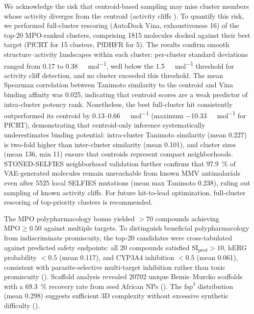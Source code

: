 \documentclass[journal=jcisd8,manuscript=article]{achemso}
\begin{document}
We acknowledge the risk that centroid-based sampling may miss cluster members whose activity diverges from the centroid (activity cliffs \cite{Maggiora2006}). To quantify this risk, we performed full-cluster rescoring (AutoDock Vina, exhaustiveness \num{16}) of the top-20 MPO-ranked clusters, comprising \num{1815} molecules docked against their best target (PfCRT for 15 clusters, PfDHFR for 5). The results confirm smooth structure--activity landscapes within each cluster: per-cluster standard deviations ranged from \num{0.17} to \num{0.38}~\si{\kilo\calorie\per\mole}, well below the \qty{1.5}{\kilo\calorie\per\mole} threshold for activity cliff detection, and no cluster exceeded this threshold. The mean Spearman correlation between Tanimoto similarity to the centroid and Vina binding affinity was \num{0.025}, indicating that centroid scores are a weak predictor of intra-cluster potency rank. Nonetheless, the best full-cluster hit consistently outperformed its centroid by \numrange{0.13}{0.66}~\si{\kilo\calorie\per\mole} (maximum \qty{-10.33}{\kilo\calorie\per\mole} for PfCRT), demonstrating that centroid-only inference systematically underestimates binding potential: intra-cluster Tanimoto similarity (mean \num{0.227}) is two-fold higher than inter-cluster similarity (mean \num{0.101}), and cluster sizes (mean \num{136}, min \num{11}) ensure that centroids represent compact neighborhoods. STONED-SELFIES neighborhood validation further confirms that \qty{97.9}{\percent} of VAE-generated molecules remain unreachable from known MMV antimalarials even after \num{5525} local SELFIES mutations (mean max Tanimoto \num{0.238}), ruling out sampling of known activity cliffs. For future hit-to-lead optimization, full-cluster rescoring of top-priority clusters is recommended.

The MPO polypharmacology bonus yielded $ > \num{70}$ compounds achieving $\text{MPO} \geq \num{0.50}$ against multiple targets. To distinguish beneficial polypharmacology from indiscriminate promiscuity, the top-20 candidates were cross-tabulated against predicted safety endpoints: all \num{20} compounds satisfied $\text{SI}_{\text{pred}} > \num{10}$, hERG probability $< \num{0.5}$ (mean \num{0.117}), and CYP3A4 inhibition $< \num{0.5}$ (mean \num{0.061}), consistent with parasite-selective multi-target inhibition rather than toxic promiscuity (). Scaffold analysis revealed \num{20702} unique Bemis--Murcko scaffolds with a \qty{69.3}{\percent} recovery rate from seed African NPs (). The $\text{fsp}^3$ distribution (mean \num{0.298}) suggests sufficient 3D complexity without excessive synthetic difficulty ().
\end{document}
